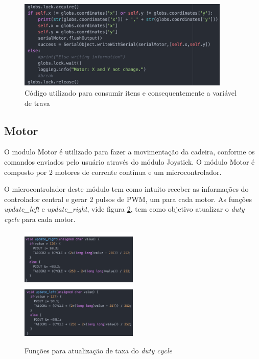   \begin{figure}[!htb]
  \centering
  \includegraphics[width=0.9\textwidth]{figuras/resultados/motor_lock}
  \caption{Código utilizado para consumir itens e consequentemente a variável de trava}
  \label{fig:motor_lock}
  \end{figure}

\subsection{Motor}

    O modulo Motor é utilizado para fazer a movimentação da cadeira, conforme os comandos enviados pelo usuário através do módulo Joystick. O módulo Motor é composto por 2 motores de corrente contínua e um microcontrolador.

    O microcontrolador deste módulo tem como intuito receber as informações do controlador central e gerar 2 pulsos de PWM, um para cada motor. As funções \textit{update\_left} e \textit{update\_right}, vide figura \ref{fig:update_motors}, tem como objetivo atualizar o \textit{duty cycle} para cada motor.

    \begin{figure}[!htb]
    \centering
    \includegraphics[width = 0.5\textwidth]{figuras/resultados/update_motor_right}
    \includegraphics[width = 0.5\textwidth]{figuras/resultados/update_motor_left}
    \caption{Funções para atualização de taxa do \textit{duty cycle}}
    \label{fig:update_motors}
    \end{figure}

